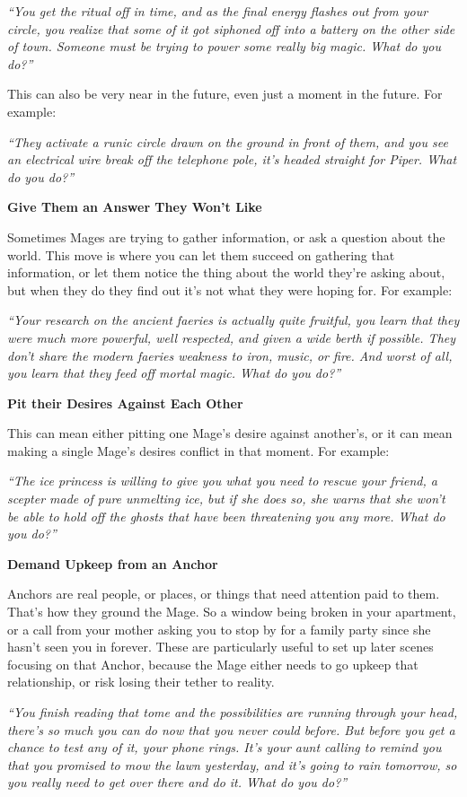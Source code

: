 \documentclass[
  oneside,
  statementpaper,
  9pt]{memoir}
\begin{document}
\emph{``You get the ritual off in time, and as the final energy flashes
out from your circle, you realize that some of it got siphoned off into
a battery on the other side of town. Someone must be trying to power
some really big magic. What do you do?''}

This can also be very near in the future, even just a moment in the
future. For example:

\emph{``They activate a runic circle drawn on the ground in front of
them, and you see an electrical wire break off the telephone pole, it's
headed straight for Piper. What do you do?''}

\textbf{Give Them an Answer They Won't Like}

Sometimes Mages are trying to gather information, or ask a question
about the world. This move is where you can let them succeed on
gathering that information, or let them notice the thing about the world
they're asking about, but when they do they find out it's not what they
were hoping for. For example:

\emph{``Your research on the ancient faeries is actually quite fruitful,
you learn that they were much more powerful, well respected, and given a
wide berth if possible. They don't share the modern faeries weakness to
iron, music, or fire. And worst of all, you learn that they feed off
mortal magic. What do you do?''}

\textbf{Pit their Desires Against Each Other}

This can mean either pitting one Mage's desire against another's, or it
can mean making a single Mage's desires conflict in that moment. For
example:

\emph{``The ice princess is willing to give you what you need to rescue
your friend, a scepter made of pure unmelting ice, but if she does so,
she warns that she won't be able to hold off the ghosts that have been
threatening you any more. What do you do?''}

\textbf{Demand Upkeep from an Anchor}

Anchors are real people, or places, or things that need attention paid
to them. That's how they ground the Mage. So a window being broken in
your apartment, or a call from your mother asking you to stop by for a
family party since she hasn't seen you in forever. These are
particularly useful to set up later scenes focusing on that Anchor,
because the Mage either needs to go upkeep that relationship, or risk
losing their tether to reality.

\emph{``You finish reading that tome and the possibilities are running
through your head, there's so much you can do now that you never could
before. But before you get a chance to test any of it, your phone rings.
It's your aunt calling to remind you that you promised to mow the lawn
yesterday, and it's going to rain tomorrow, so you really need to get
over there and do it. What do you do?''}
\end{document}
